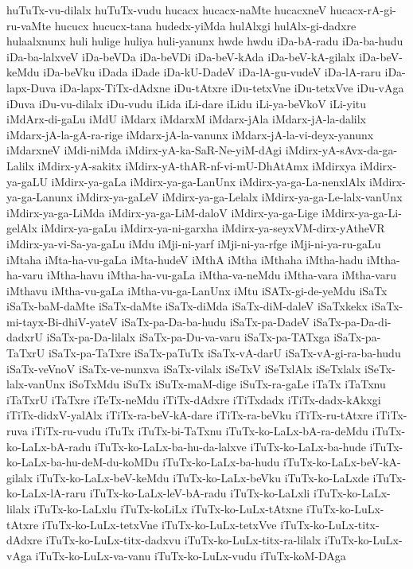 {huTuTx-vu-dilalx
huTuTx-vudu
hucacx
hucacx-naMte
hucacxneV
hucacx-rA-gi-ru-vaMte
hucucx
hucucx-tana
hudedx-yiMda
hulAlxgi
hulAlx-gi-dadxre
hulaalxnunx
huli
hulige
huliya
huli-yanunx
hwde
hwdu
iDa-bA-radu
iDa-ba-hudu
iDa-ba-lalxveV
iDa-beVDa
iDa-beVDi
iDa-beV-kAda
iDa-beV-kA-gilalx
iDa-beV-keMdu
iDa-beVku
iDada
iDade
iDa-kU-DadeV
iDa-lA-gu-vudeV
iDa-lA-raru
iDa-lapx-Duva
iDa-lapx-TiTx-dAdxne
iDu-tAtxre
iDu-tetxVne
iDu-tetxVve
iDu-vAga
iDuva
iDu-vu-dilalx
iDu-vudu
iLida
iLi-dare
iLidu
iLi-ya-beVkoV
iLi-yitu
iMdArx-di-gaLu
iMdU
iMdarx
iMdarxM
iMdarx-jAla
iMdarx-jA-la-dalilx
iMdarx-jA-la-gA-ra-rige
iMdarx-jA-la-vanunx
iMdarx-jA-la-vi-deyx-yanunx
iMdarxneV
iMdi-niMda
iMdirx-yA-ka-SaR-Ne-yiM-dAgi
iMdirx-yA-sAvx-da-ga-Lalilx
iMdirx-yA-sakitx
iMdirx-yA-thAR-nf-vi-mU-DhAtAmx
iMdirxya
iMdirx-ya-gaLU
iMdirx-ya-gaLa
iMdirx-ya-ga-LanUnx
iMdirx-ya-ga-La-nenxlAlx
iMdirx-ya-ga-Lanunx
iMdirx-ya-gaLeV
iMdirx-ya-ga-Lelalx
iMdirx-ya-ga-Le-lalx-vanUnx
iMdirx-ya-ga-LiMda
iMdirx-ya-ga-LiM-daloV
iMdirx-ya-ga-Lige
iMdirx-ya-ga-Li-gelAlx
iMdirx-ya-gaLu
iMdirx-ya-ni-garxha
iMdirx-ya-seyxVM-dirx-yAtheVR
iMdirx-ya-vi-Sa-ya-gaLu
iMdu
iMji-ni-yarf
iMji-ni-ya-rfge
iMji-ni-ya-ru-gaLu
iMtaha
iMta-ha-vu-gaLa
iMta-hudeV
iMthA
iMtha
iMthaha
iMtha-hadu
iMtha-ha-varu
iMtha-havu
iMtha-ha-vu-gaLa
iMtha-va-neMdu
iMtha-vara
iMtha-varu
iMthavu
iMtha-vu-gaLa
iMtha-vu-ga-LanUnx
iMtu
iSATx-gi-de-yeMdu
iSaTx
iSaTx-baM-daMte
iSaTx-daMte
iSaTx-diMda
iSaTx-diM-daleV
iSaTxkekx
iSaTx-mi-tayx-Bi-dhiV-yateV
iSaTx-pa-Da-ba-hudu
iSaTx-pa-DadeV
iSaTx-pa-Da-di-dadxrU
iSaTx-pa-Da-lilalx
iSaTx-pa-Du-va-varu
iSaTx-pa-TATxga
iSaTx-pa-TaTxrU
iSaTx-pa-TaTxre
iSaTx-paTuTx
iSaTx-vA-darU
iSaTx-vA-gi-ra-ba-hudu
iSaTx-veVnoV
iSaTx-ve-nunxva
iSaTx-vilalx
iSeTxV
iSeTxlAlx
iSeTxlalx
iSeTx-lalx-vanUnx
iSoTxMdu
iSuTx
iSuTx-maM-dige
iSuTx-ra-gaLe
iTaTx
iTaTxnu
iTaTxrU
iTaTxre
iTeTx-neMdu
iTiTx-dAdxre
iTiTxdadx
iTiTx-dadx-kAkxgi
iTiTx-didxV-yalAlx
iTiTx-ra-beV-kA-dare
iTiTx-ra-beVku
iTiTx-ru-tAtxre
iTiTx-ruva
iTiTx-ru-vudu
iTuTx
iTuTx-bi-TaTxnu
iTuTx-ko-LaLx-bA-ra-deMdu
iTuTx-ko-LaLx-bA-radu
iTuTx-ko-LaLx-ba-hu-da-lalxve
iTuTx-ko-LaLx-ba-hude
iTuTx-ko-LaLx-ba-hu-deM-du-koMDu
iTuTx-ko-LaLx-ba-hudu
iTuTx-ko-LaLx-beV-kA-gilalx
iTuTx-ko-LaLx-beV-keMdu
iTuTx-ko-LaLx-beVku
iTuTx-ko-LaLxde
iTuTx-ko-LaLx-lA-raru
iTuTx-ko-LaLx-leV-bA-radu
iTuTx-ko-LaLxli
iTuTx-ko-LaLx-lilalx
iTuTx-ko-LaLxlu
iTuTx-koLiLx
iTuTx-ko-LuLx-tAtxne
iTuTx-ko-LuLx-tAtxre
iTuTx-ko-LuLx-tetxVne
iTuTx-ko-LuLx-tetxVve
iTuTx-ko-LuLx-titx-dAdxre
iTuTx-ko-LuLx-titx-dadxvu
iTuTx-ko-LuLx-titx-ra-lilalx
iTuTx-ko-LuLx-vAga
iTuTx-ko-LuLx-va-vanu
iTuTx-ko-LuLx-vudu
iTuTx-koM-DAga
}

